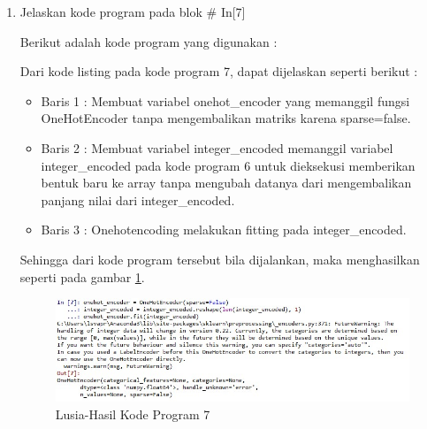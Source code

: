 \begin{enumerate}
\item Jelaskan kode program pada blok \# In[7]
	\par Berikut adalah kode program yang digunakan :
	
	\par Dari kode listing pada kode program 7, dapat dijelaskan seperti berikut :
	\begin{itemize}
	\item Baris 1	: Membuat variabel onehot\_encoder yang memanggil fungsi OneHotEncoder tanpa mengembalikan matriks karena sparse=false.
	\item Baris 2	: Membuat variabel integer\_encoded memanggil variabel integer\_encoded pada kode program 6 untuk dieksekusi memberikan bentuk baru ke array tanpa mengubah datanya dari mengembalikan panjang nilai dari integer\_encoded.
	\item Baris 3	: Onehotencoding melakukan fitting pada integer\_encoded.
	\end{itemize}
	\par Sehingga dari kode program tersebut bila dijalankan, maka menghasilkan seperti pada gambar \ref{7B7}.
		\begin{figure}[!hbtp]
		\centering
		\includegraphics[scale=0.5]{figures/w7.jpg}
		\caption{Lusia-Hasil Kode Program 7}
		\label{7B7}
		\end{figure}


\end{enumerate}
